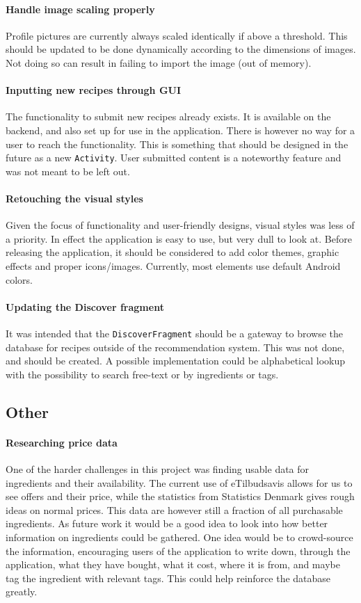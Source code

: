 \paragraph{Handle image scaling properly}
Profile pictures are currently always scaled identically if above a threshold. This should be updated to be done dynamically according to the dimensions of images. Not doing so can result in failing to import the image (out of memory).

\paragraph{Inputting new recipes through GUI}
The functionality to submit new recipes already exists. It is available on the backend, and also set up for use in the application. There is however no way for a user to reach the functionality. This is something that should be designed in the future as a new \texttt{Activity}. User submitted content is a noteworthy feature and was not meant to be left out.

\paragraph{Retouching the visual styles}
Given the focus of functionality and user-friendly designs, visual styles was less of a priority. In effect the application is easy to use, but very dull to look at. Before releasing the application, it should be considered to add color themes, graphic effects and proper icons/images. Currently, most elements use default Android colors.

\paragraph{Updating the Discover fragment}
It was intended that the \texttt{DiscoverFragment} should be a gateway to browse the database for recipes outside of the recommendation system. This was not done, and should be created. A possible implementation could be alphabetical lookup with the possibility to search free-text or by ingredients or tags.

\subsection{Other}

\paragraph{Researching price data}
One of the harder challenges in this project was finding usable data for ingredients and their availability. The current use of eTilbudsavis allows for us to see offers and their price, while the statistics from Statistics Denmark gives rough ideas on normal prices.
This data are however still a fraction of all purchasable ingredients. As future work it would be a good idea to look into how better information on ingredients could be gathered. One idea would be to crowd-source the information, encouraging users of the application to write down, through the application, what they have bought, what it cost, where it is from, and maybe tag the ingredient with relevant tags. This could help reinforce the database greatly.
